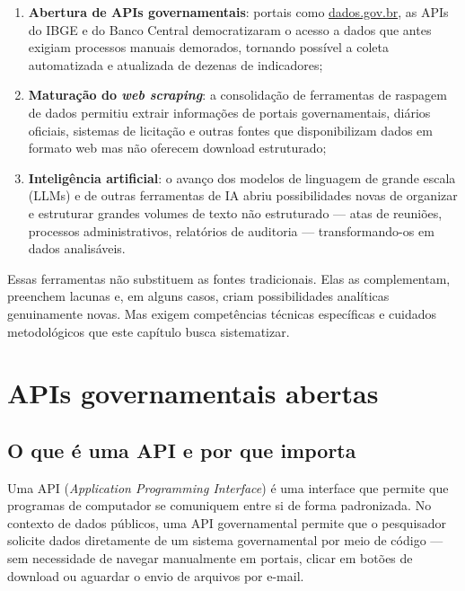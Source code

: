 \begin{enumerate}
  \item \textbf{Abertura de APIs governamentais}: portais como \url{dados.gov.br}, as APIs do IBGE e do Banco Central democratizaram o acesso a dados que antes exigiam processos manuais demorados, tornando possível a coleta automatizada e atualizada de dezenas de indicadores;

  \item \textbf{Maturação do \textit{web scraping}}: a consolidação de ferramentas de raspagem de dados permitiu extrair informações de portais governamentais, diários oficiais, sistemas de licitação e outras fontes que disponibilizam dados em formato web mas não oferecem download estruturado;

  \item \textbf{Inteligência artificial}: o avanço dos modelos de linguagem de grande escala (LLMs) e de outras ferramentas de IA abriu possibilidades novas de organizar e estruturar grandes volumes de texto não estruturado --- atas de reuniões, processos administrativos, relatórios de auditoria --- transformando-os em dados analisáveis.
\end{enumerate}

Essas ferramentas não substituem as fontes tradicionais. Elas as complementam, preenchem lacunas e, em alguns casos, criam possibilidades analíticas genuinamente novas. Mas exigem competências técnicas específicas e cuidados metodológicos que este capítulo busca sistematizar.

\section{APIs governamentais abertas}

\subsection{O que é uma API e por que importa}

Uma API (\textit{Application Programming Interface}) é uma interface que permite que programas de computador se comuniquem entre si de forma padronizada. No contexto de dados públicos, uma API governamental permite que o pesquisador solicite dados diretamente de um sistema governamental por meio de código --- sem necessidade de navegar manualmente em portais, clicar em botões de download ou aguardar o envio de arquivos por e-mail.

